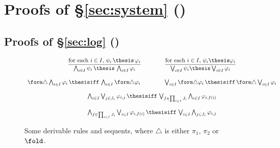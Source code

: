 \section{Proofs of \S\ref{sec:system} ()}

\subsection{Proofs of \S\ref{sec:log} ()}
\label{sec:proof:log}

\begin{figure}[t!]
\[
\begin{array}{c}

\dfrac{\text{for each $i \in I$, $\psi_i \,\thesis\, \varphi_i$}}
  {\bigwedge_{i \in I} \psi_i \,\thesis\, \bigwedge_{i \in I}\varphi_i}

\qquad\qquad

\dfrac{\text{for each $i \in I$, $\psi_i \thesis \varphi_i$}}
  {\bigvee_{i \in I} \psi_i \thesis \bigvee_{i \in I}\varphi_i}

\\\\

  \form\triangle \bigwedge_{i \in I} \varphi_i
  \,\thesisiff\,
  \bigwedge_{i \in I} \form\triangle \varphi_i

\qquad\qquad

  \bigvee_{i \in I} \form\triangle\varphi_i
  \,\thesisiff\,
  \form\triangle \bigvee_{i \in I}\varphi_i

\\\\

  \bigwedge_{i \in I} \bigvee_{j \in J_i} \varphi_{i,j}
  \,\thesisiff\,
  \bigvee_{f \in \prod_{i \in I}J_i}\bigwedge_{i \in I} \varphi_{i,f(i)}

\\\\

  \bigwedge_{f \in \prod_{i \in I}J_i}\bigvee_{i \in I} \varphi_{i,f(i)}
  \,\thesisiff\,
  \bigvee_{i \in I}\bigwedge_{j \in J_i}\varphi_{i,j}
\end{array}
\]
\caption{Some derivable rules and sequents,
where $\triangle$ is either $\pi_1$, $\pi_2$ or $\fold$.%
\label{fig:proof:log:derivable}}
\end{figure}

